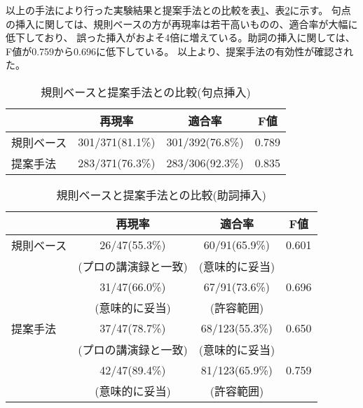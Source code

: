 以上の手法により行った実験結果と提案手法との比較を表\ref{comp_kuten}、表\ref{comp_joshi}に示す。
句点の挿入に関しては、規則ベースの方が再現率は若干高いものの、適合率が大幅に低下しており、
誤った挿入がおよそ4倍に増えている。助詞の挿入に関しては、F値が0.759から0.696に低下している。
以上より、提案手法の有効性が確認された。

\begin{table}[t]
\small
\caption{規則ベースと提案手法との比較(句点挿入)}
\centering
 \begin{tabular}{|l||c|c|c|}
\hline
			&再現率			&適合率			&F値		\\\hline\hline
規則ベース		& 301/371(81.1\%)	& 301/392(76.8\%)	&0.789		\\\hline
提案手法		& 283/371(76.3\%)	& 283/306(92.3\%)	&0.835		\\\hline
 \end{tabular}
 \label{comp_kuten}
\vspace{-3.0mm}
\end{table}

\begin{table}[t]
\small
\caption{規則ベースと提案手法との比較(助詞挿入)}
\centering
 \begin{tabular}{|l||c|c|c|}
\hline
			&再現率			&適合率			&F値		\\\hline\hline
規則ベース		& 26/47(55.3\%)		& 60/91(65.9\%)		&0.601		\\
			& (プロの講演録と一致)	& (意味的に妥当)	&		\\
			& 31/47(66.0\%)		& 67/91(73.6\%)		&0.696		\\
			& (意味的に妥当)	& (許容範囲)		&		\\\hline
提案手法		& 37/47(78.7\%)		& 68/123(55.3\%)	&0.650		\\
			& (プロの講演録と一致)	& (意味的に妥当)	&		\\
			& 42/47(89.4\%)		& 81/123(65.9\%)	&0.759		\\
			& (意味的に妥当)	& (許容範囲)		&		\\\hline
 \end{tabular}
 \label{comp_joshi}
\vspace{-3.0mm}
\end{table}

